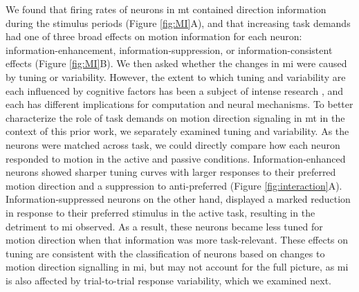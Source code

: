 We found that firing rates of neurons in \gls{mt} contained direction information during the stimulus periods (Figure \ref{fig:MI}A), and that increasing task demands had one of three broad effects on motion information for each neuron: information-enhancement, information-suppression, or information-consistent effects (Figure \ref{fig:MI}B). We then asked whether the changes in \gls{mi} were caused by tuning or variability. However, the extent to which tuning and variability are each influenced by cognitive factors has been a subject of intense research \parencite{Renart2014,Gilbert2013}, and each has different implications for computation and neural mechanisms. To better characterize the role of task demands on motion direction signaling in \gls{mt} in the context of this prior work, we separately examined tuning and variability. As the neurons were matched across task, we could directly compare how each neuron responded to motion in the active and passive conditions. Information-enhanced neurons showed sharper tuning curves with larger responses to their preferred motion direction and a suppression to anti-preferred (Figure \ref{fig:interaction}A). Information-suppressed neurons on the other hand, displayed a marked reduction in response to their preferred stimulus in the active task, resulting in the detriment to \gls{mi} observed. As a result, these neurons became less tuned for motion direction when that information was more task-relevant. These effects on tuning are consistent with the classification of neurons based on changes to motion direction signalling in \gls{mi}, but may not account for the full picture, as \gls{mi} is also affected by trial-to-trial response variability, which we examined next. 

